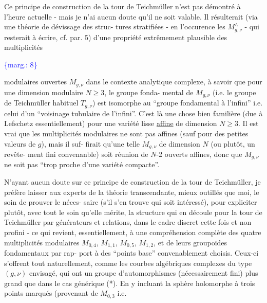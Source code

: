 \documentclass[11pt]{article}
\newcommand{\scanpage}[1]{\par\bigskip\noindent{\small\sffamily[scan #1]}\par}
\newcommand{\mspage}[1]{{\small\sffamily[p.\,#1]}}
\newcommand{\margin}[1]{\textcolor{blue}{\{\textsf{marg.:} #1\}}}
\newcommand{\uline}[1]{\underline{#1}}
\begin{document}
Ce principe de construction de la tour de Teichmüller n'est
pas démontré à l'heure actuelle - mais je n'ai aucun doute qu'il ne
soit valable. Il résulterait (via une théorie de dévissage des struc-%
tures stratifiées - en l'occurence les $M^{\wedge}_{g,\nu}$ - qui resterait à écrire,
cf. par. 5) d'une propriété extrêmement plausible des multiplicités

\margin{8}

\clearpage
\scanpage{119/9}
\mspage{7}

modulaires ouvertes $M_{g,\nu}$ dans le contexte analytique complexe,
à savoir que pour une dimension modulaire $N \geq 3$, le groupe fonda-%
mental de $M_{g,\nu}$ (i.e. le groupe de Teichmüller habituel $T_{g,\nu}$)
est isomorphe au ``groupe fondamental à l'infini'' i.e. celui d'un
``voisinage tubulaire de l'infini''. C'est là une chose bien familière
(due à Lefschetz essentiellement) pour une variété lisse \uline{affine} de
dimension $N \geq 3$. Il est vrai que les multiplicités modulaires ne
sont pas affines (sauf pour des petites valeurs de $g$), mais il suf-%
firait qu'une telle $M_{g,\nu}$ de dimension $N$ (ou plutôt, un revête-%
ment fini convenanble) soit réunion de $N$-2 ouverts affines, donc
que $M_{g,\nu}$ ne soit pas ``trop proche d'une variété compacte''.

N'ayant aucun doute sur ce principe de construction de la
tour de Teichmüller, je préfère laisser aux experts de la théorie
transcendante, mieux outillés que moi, le soin de prouver le néces-%
saire (s'il s'en trouve qui soit intéressé), pour expliciter plutôt,
avec tout le soin qu'elle mérite, la structure qui en découle pour
la tour de Teichmüller par générateurs et relations, dans le cadre
discret cette fois et non profini - ce qui revient, essentiellement,
à une compréhension complète des quatre multiplicités modulaires
$M_{0,4}$, $M_{1,1}$, $M_{0,5}$, $M_{1,2}$, et de leurs groupoïdes fondamentaux par rap-%
port à des ``points base'' convenablement choisis. Ceux-ci s'offrent
tout naturellement, comme les courbes algébriques complexes du type
$(g,\nu)$ envisagé, qui ont un groupe d'automorphismes (nécessairement
fini) plus grand que dans le cas générique (*). En y incluant la
sphère holomorphe à trois points marqués (provenant de $M_{0,3}$ i.e.
\end{document}
